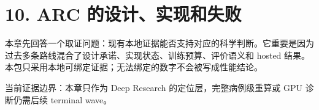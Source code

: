 \section{10. ARC 的设计、实现和失败}

本章先回答一个取证问题：现有本地证据能否支持对应的科学判断。它重要是因为过去多条路线混合了设计承诺、实现状态、训练预算、评价语义和 hosted 结果。本包只采用本地可绑定证据；无法绑定的数字不会被写成性能结论。



当前证据边界：本章只作为 Deep Research 的定位层，完整病例级重算或 GPU 诊断仍需后续 terminal wave。



\clearpage